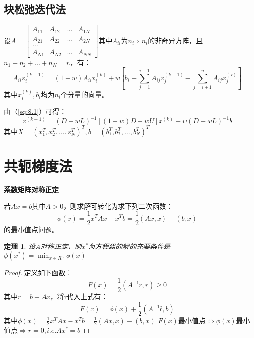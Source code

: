 \documentclass[a4paper]{article}
\newtheorem{theorem}{定理}[section]
\begin{document}
\subsection{块松弛迭代法}
设$A=\left[\begin{matrix}
  A_{11} & A_{12} & \dots & A_{1N} \\
  A_{21} & A_{22} & \dots & A_{2N} \\
  \dots \\
  A_{N1} & A_{N2} & \dots & A_{NN}
\end{matrix}\right]$其中$A_{ii}$为$n_i\times n_i $的非奇异方阵，且$n_1+n_2+\dots+n_N=n$，有：
\begin{equation}
  A_{ii}x_i^{(k+1)} = (1-w)A_{ii}x_i^{(k)}+w[b_i-\sum^{i-1}_{j=1}A_{ij}x^{(k+1)}_j-\sum^n_{j=i+1}A_{ij}x^{(k)}_j]
  \label{eq:8.1}
\end{equation}
其中$x_i^{(k)}, b_i$均为$n_i$个分量的向量。

由（\ref{eq:8.1}）可得：
$$x^{(k+1)}=(D-wL)^{-1}[(1-w)D+wU]x^{(k)}+w(D-wL)^{-1}b $$
其中$X=(x_1^T, x_2^T, \dots, x^T_N)^T, b=(b_1^T, b_2^T, \dots, b_N^T)^T$

\section{共轭梯度法}
\textbf{系数矩阵对称正定}

若$Ax=b$其中$A>0$，则求解可转化为求下列二次函数：
\begin{equation}
  \phi(x)=\frac{1}{2}x^TAx-x^Tb=\frac{1}{2}(Ax,x)-(b,x) 
\end{equation}
的最小值点问题。

\begin{theorem}
  设A对称正定，则$x^*$为方程组的解的充要条件是$\phi(x^*)=\min_{x\in R^n}\phi(x) $
\end{theorem}
\begin{proof}
  定义如下函数：
  $$F(x)=\frac{1}{2}(A^{-1}r, r)\ge 0 $$
  其中$r=b-Ax$，将r代入上式有：
  $$F(x)=\phi(x)+\frac{1}{2}(A^{-1}b,b) $$
  其中$\phi(x)=\frac{1}{2}x^TAx-x^Tb=\frac{1}{2}(Ax,x)-(b,x) $
  $F(x)$最小值点$\Leftrightarrow$$\phi(x)$最小值点$\Rightarrow r=0, i.e. Ax^*=b$
\end{proof}
\end{document}
